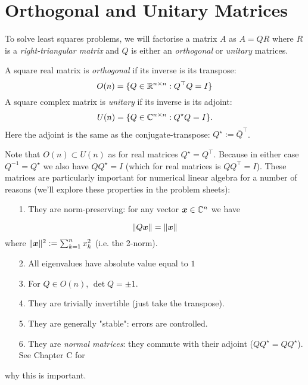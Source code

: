 
\section{Orthogonal and Unitary Matrices}
To solve least squares problems, we will  factorise a matrix $A$ as $A = QR$ where $R$ is a \emph{right-triangular matrix} and $Q$ is either an \emph{orthogonal} or \emph{unitary} matrices.

\begin{definition} A square real matrix is \emph{orthogonal} if its inverse is its transpose:
\[
O(n) = \{Q \in {\mathbb R}^{n \times n} : Q^\top Q = I \}
\]
A square complex matrix is \emph{unitary} if its inverse is its adjoint:
\[
U(n) = \{Q \in {\mathbb C}^{n \times n} : Q^\star Q = I \}.
\]
Here the adjoint is the same as the conjugate-transpose: $Q^\ensuremath{\star} := \bar Q^\ensuremath{\top}$.  \end{definition}

Note that $O(n) \ensuremath{\subset} U(n)$ as for real matrices $Q^\ensuremath{\star} = Q^\ensuremath{\top}$. Because in either case $Q^{-1} = Q^\ensuremath{\star}$ we also have $Q Q^\ensuremath{\star} = I$ (which for real matrices is $Q Q^\ensuremath{\top} = I$). These matrices are particularly important for numerical linear algebra for a number of reasons (we'll explore these properties in the problem sheets):

\begin{itemize}
\item[1. ] They are norm-preserving: for any vector $\bm{{\mbox{\boldmath$x$\unboldmath}}} \in {\mathbb C}^n$ we have

\end{itemize}
\[
\|Q \bm{{\mbox{\boldmath$x$\unboldmath}}} \| = \| \bm{{\mbox{\boldmath$x$\unboldmath}}}\|
\]
where $\| \bm{{\mbox{\boldmath$x$\unboldmath}}} \|^2 := \sum_{k=1}^n x_k^2$ (i.e. the 2-norm).

\begin{itemize}
\item[2. ] All eigenvalues have absolute value equal to $1$


\item[3. ] For $Q \ensuremath{\in} O(n)$,  $\det Q = \ensuremath{\pm}1$.


\item[4. ] They are trivially invertible (just take the transpose).


\item[5. ] They are generally "stable": errors are controlled.


\item[6. ] They are \emph{normal matrices}: they commute with their adjoint ($Q Q^\ensuremath{\star} = Q Q^\ensuremath{\star}$). See Chapter C for

\end{itemize}
why this is important. 

